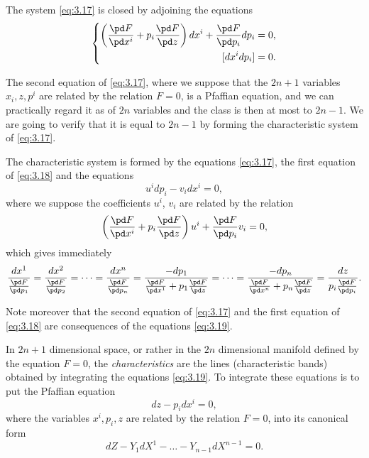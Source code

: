 The system \eqref{eq:3.17} is closed by adjoining the equations
\begin{equation}
  \label{eq:3.18}
  \left\{
    \begin{aligned}
      \left(\frac{\pd F}{\pd x^{i}}+p_{i}\frac{\pd F}{\pd z}\right) dx^{i}+\frac{\pd F}{\pd p_{i}}dp_{i}&=0,\\
      [dx^{i}dp_{i}]&=0.
    \end{aligned}
  \right.
\end{equation}

The second equation of \eqref{eq:3.17}, where we suppose that the $2n+1$ variables $x_{i},z,p^{i}$ are related by the relation $F=0$, is a Pfaffian equation, and we can practically regard it as of $2n$ variables and the class is then at most to $2n-1$. We are going to verify that it is equal to $2n-1$ by forming the characteristic system of \eqref{eq:3.17}.

The characteristic system is formed by the equations \eqref{eq:3.17}, the first equation of \eqref{eq:3.18} and the equations
\[
u^{i}dp_{i}-v_{i}dx^{i}=0,
\]
where we suppose the coefficients $u^{i}$, $v_{i}$ are related by the relation
\[
\left(\frac{\pd F}{\pd x^{i}}+p_{i}\frac{\pd F}{\pd z}\right)u^{i}+\frac{\pd F}{\pd p_{i}}v_{i}=0,
\]
which gives immediately
\begin{equation}
  \label{eq:3.19}
  \frac{dx^{1}}{\frac{\pd F}{\pd p_{1}}}=
  \frac{dx^{2}}{\frac{\pd F}{\pd p_{2}}}=
  \dots=
  \frac{dx^{n}}{\frac{\pd F}{\pd p_{n}}}=
  \frac{-dp_{1}}{\frac{\pd F}{\pd x^{1}}+p_{1}\frac{\pd F}{\pd z}}=
  \dots=
  \frac{-dp_{n}}{\frac{\pd F}{\pd x^{n}}+p_{n}\frac{\pd F}{\pd z}}=
  \frac{dz}{p_{i}\frac{\pd F}{\pd p_{i}}}.
\end{equation}

Note moreover that the second equation of \eqref{eq:3.17} and the first equation of \eqref{eq:3.18} are consequences of the equations \eqref{eq:3.19}.

\vspace{12pt}\fsec In $2n+1$ dimensional space, or rather in the $2n$ dimensional manifold defined by the equation $F=0$, the \emph{characteristics} are the lines (characteristic bands) obtained by integrating the equations \eqref{eq:3.19}. To integrate  these equations is to put the Pfaffian equation
\[
dz-p_{i}dx^{i}=0,
\]
where the variables $x^{i},p_{i},z$ are related by the relation $F=0$,  into its canonical form
\begin{equation}
  \label{eq:3.20}
  dZ-Y_{1}dX^{1}-\dots-Y_{n-1}dX^{n-1}=0.
\end{equation}

